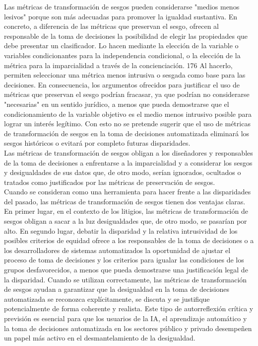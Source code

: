 Las métricas de transformación de sesgos pueden considerarse "medios menos lesivos" porque son más adecuadas para promover la igualdad sustantiva. En concreto, a diferencia de las métricas que preservan el sesgo, ofrecen al responsable de la toma de decisiones la posibilidad de elegir las propiedades que debe presentar un clasificador. Lo hacen mediante la elección de la variable o variables condicionantes para la independencia condicional, o la elección de la métrica para la imparcialidad a través de la concienciación. 176 Al hacerlo, permiten seleccionar una métrica menos intrusiva o sesgada como base para las decisiones. En consecuencia, los argumentos ofrecidos para justificar el uso de métricas que preservan el sesgo podrían fracasar, ya que podrían no considerarse "necesarias" en un sentido jurídico, a menos que pueda demostrarse que el condicionamiento de la variable objetivo es el medio menos intrusivo posible para lograr un interés legítimo. Con esto no se pretende sugerir que el uso de métricas de transformación de sesgos en la toma de decisiones automatizada eliminará los sesgos históricos o evitará por completo futuras disparidades.\\

Las métricas de transformación de sesgos obligan a los diseñadores y responsables de la toma de decisiones a enfrentarse a la imparcialidad y a considerar los sesgos y desigualdades de sus datos que, de otro modo, serían ignorados, ocultados o tratados como justificados por las métricas de preservación de sesgos.\\

Cuando se consideran como una herramienta para hacer frente a las disparidades del pasado, las métricas de transformación de sesgos tienen dos ventajas claras. En primer lugar, en el contexto de los litigios, las métricas de transformación de sesgos obligan a sacar a la luz desigualdades que, de otro modo, se pasarían por alto. En segundo lugar, debatir la disparidad y la relativa intrusividad de los posibles criterios de equidad ofrece a los responsables de la toma de decisiones o a los desarrolladores de sistemas automatizados la oportunidad de ajustar el proceso de toma de decisiones y los criterios para igualar las condiciones de los grupos desfavorecidos, a menos que pueda demostrarse una justificación legal de la disparidad. Cuando se utilizan correctamente, las métricas de transformación de sesgos ayudan a garantizar que la desigualdad en la toma de decisiones automatizada se reconozca explícitamente, se discuta y se justifique potencialmente de forma coherente y realista. Este tipo de autorreflexión crítica y previsión es esencial para que los usuarios de la IA, el aprendizaje automático y la toma de decisiones automatizada en los sectores público y privado desempeñen un papel más activo en el desmantelamiento de la desigualdad.\\

